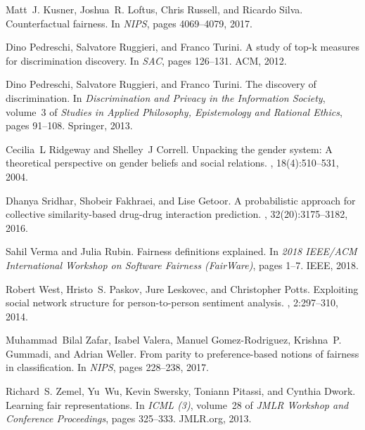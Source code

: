 \documentclass[11pt]{article}
\begin{document}
\begin{thebibliography}{10}
\begin{small}
Matt~J. Kusner, Joshua~R. Loftus, Chris Russell, and Ricardo Silva.
\newblock Counterfactual fairness.
\newblock In {\em {NIPS}}, pages 4069--4079, 2017.

Dino Pedreschi, Salvatore Ruggieri, and Franco Turini.
\newblock A study of top-k measures for discrimination discovery.
\newblock In {\em {SAC}}, pages 126--131. {ACM}, 2012.

Dino Pedreschi, Salvatore Ruggieri, and Franco Turini.
\newblock The discovery of discrimination.
\newblock In {\em Discrimination and Privacy in the Information Society},
  volume~3 of {\em Studies in Applied Philosophy, Epistemology and Rational
  Ethics}, pages 91--108. Springer, 2013.

Cecilia~L Ridgeway and Shelley~J Correll.
\newblock Unpacking the gender system: A theoretical perspective on gender
  beliefs and social relations.
, 18(4):510--531, 2004.

Dhanya Sridhar, Shobeir Fakhraei, and Lise Getoor.
\newblock A probabilistic approach for collective similarity-based drug-drug
  interaction prediction.
, 32(20):3175--3182, 2016.

Sahil Verma and Julia Rubin.
\newblock Fairness definitions explained.
\newblock In {\em 2018 IEEE/ACM International Workshop on Software Fairness
  (FairWare)}, pages 1--7. IEEE, 2018.

Robert West, Hristo~S. Paskov, Jure Leskovec, and Christopher Potts.
\newblock Exploiting social network structure for person-to-person sentiment
  analysis.
, 2:297--310, 2014.

Muhammad~Bilal Zafar, Isabel Valera, Manuel Gomez{-}Rodriguez, Krishna~P.
  Gummadi, and Adrian Weller.
\newblock From parity to preference-based notions of fairness in
  classification.
\newblock In {\em {NIPS}}, pages 228--238, 2017.

Richard~S. Zemel, Yu~Wu, Kevin Swersky, Toniann Pitassi, and Cynthia Dwork.
\newblock Learning fair representations.
\newblock In {\em {ICML} {(3)}}, volume~28 of {\em {JMLR} Workshop and
  Conference Proceedings}, pages 325--333. JMLR.org, 2013.

\end{small}
\end{thebibliography}
\end{document}
